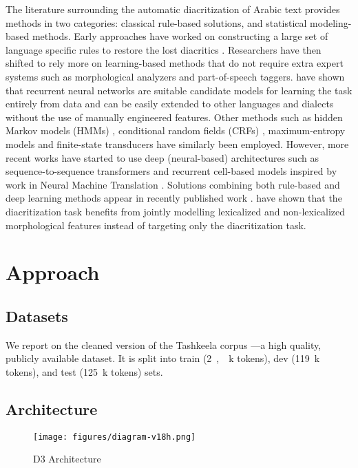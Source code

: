 \documentclass[11pt]{article}
\begin{document}
The literature surrounding the automatic diacritization of Arabic text provides methods in two categories: classical rule-based solutions, and statistical modeling-based methods. Early approaches have worked on constructing a large set of language specific rules to restore the lost diacritics \cite{MADA,zitouni06,pasha14-madamira,darwish17}. Researchers have then shifted to rely more on learning-based methods that do not require extra expert systems such as morphological analyzers and part-of-speech taggers. \cite{belinkov-glass-2015-arabic} have shown that recurrent neural networks are suitable candidate models for learning the task entirely from data and can be easily extended to other languages and dialects without the use of manually engineered features. Other methods such as hidden Markov models (HMMs) \cite{elshafei06}, conditional random fields (CRFs) \cite{darwish17}, maximum-entropy models \cite{zitouni06} and finite-state transducers \cite{shieber05} have similarly been employed. However, more recent works have started to use deep (neural-based) architectures such as sequence-to-sequence transformers and recurrent cell-based models inspired by work in Neural Machine Translation \cite{mubarak19-highly}. Solutions combining both rule-based and deep learning methods appear in recently published work \cite{hamza20}. \cite{joint2020} have shown that the diacritization task benefits from jointly modelling lexicalized and non-lexicalized morphological features instead of targeting only the diacritization task.

\section{Approach}

\subsection{Datasets}
We report on the cleaned version of the Tashkeela corpus \cite{fadel19}---a high quality, publicly available dataset. It is split into train (\si{2, k} tokens), dev (\si{119 k} tokens), and test (\si{125 k} tokens) sets.

\subsection{Architecture}
\label{sub:arch}

\begin{figure}[ht]
    \centering
    \texttt{[image: figures/diagram-v18h.png]}
    \caption{D3 Architecture}
    \label{fig:arch}
\end{figure}
\end{document}
